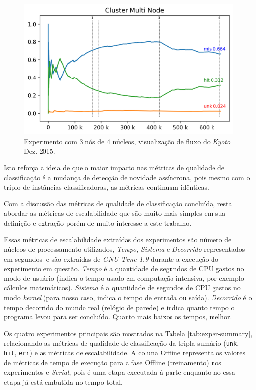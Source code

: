 \begin{figure}[htb]
  \centering
  \includegraphics[width=0.75\linewidth]{experiments/tmi-n12-log.png}
  \caption{Experimento \mfog \multi com 3 nós de 4 núcleos, visualização de fluxo do \dataset \emph{Kyoto} Dez. 2015.}
  \label{fig:multi-flow}
\end{figure}

Isto reforça a ideia de que o maior impacto nas métricas de qualidade de
classificação é a mudança de detecção de novidade assíncrona, pois mesmo com o
triplo de instâncias classificadoras, as métricas continuam idênticas.

Com a discussão das métricas de qualidade de classificação concluída, resta
abordar as métricas de escalabilidade que são muito mais simples em sua
definição e extração porém de muito interesse a este trabalho.

Essas métricas de escalabilidade extraídas dos experimentos são número de núcleos de processamento
utilizados, \emph{Tempo}, \emph{Sistema} e \emph{Decorrido} representados em
segundos, e são extraídas de \emph{GNU Time 1.9} durante a execução do experimento
em questão.
\emph{Tempo} é a quantidade de segundos de CPU gastos no modo de usuário
(indica o tempo usado em computação intensiva, por exemplo cálculos matemáticos).
\emph{Sistema} é a quantidade de segundos de CPU gastos no modo \emph{kernel} (para
nosso caso, indica o tempo de entrada ou saída).
\emph{Decorrido} é o tempo decorrido do mundo real (relógio de parede) e indica
quanto tempo o programa levou para ser concluído.
Quanto mais baixos os tempos, melhor.

Os quatro experimentos principais são mostrados na Tabela
\ref{tab:exper-summary}, relacionando as métricas de qualidade de classificação
da tripla-sumário (\texttt{unk}, \texttt{hit}, \texttt{err}) e as métricas de
escalabilidade.
A coluna Offline representa os valores de métricas de tempo de execução para a
fase Offline (treinamento) nos experimentos \mfog e \emph{Serial}, pois é uma
etapa executada à parte enquanto no  essa etapa já está embutida no
tempo total.

